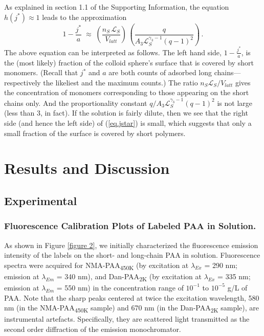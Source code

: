 \documentclass[twoside,twocolumn,9pt]{article}
\newcommand{\leng}{\mathcal{L}}
\begin{document}
As explained in section 1.1 of the Supporting Information, the equation
$h(j^*)\approx 1$ leads to the approximation
\begin{equation}
    \label{eq.jstar}
     1-\frac{j^*}{a}     \; \approx   \; 
        \left(  \frac{n_S\,\leng_S}{V_{latt} }\right) \,\left(   \frac{q}{A_3\leng_S^{\gamma_3-1}(q-1)^2}\right)  \,.
\end{equation}
The above equation can be interpreted as follows.  The left hand side, $1-\frac{j^*}{a}$, is the (most likely) fraction of the colloid sphere's surface that is covered by short monomers.  (Recall that $j^*$ and $a$ are both
counts of adsorbed long chains---respectively the likeliest and the maximum counts.)
The ratio $n_S\leng_S/V_{latt}$ gives
the concentration of monomers corresponding to those appearing on the short chains only.
And the proportionality constant $q/A_3\leng_S^{\gamma_3-1}(q-1)^2$ is not large (less than 3, in fact).
If the solution is fairly dilute, then we see that the right side (and hence the left side) of (\ref{eq.jstar}) is small, which suggests
that only a small fraction of the surface is covered by short polymers.



\section{Results and Discussion}   %
     \label{sec-results}

\subsection{Experimental}    %
    \label{sec-res-exp}

\subsubsection{Fluorescence Calibration Plots of Labeled PAA in Solution.}  %
    \label{sec-fluocalib}

As shown in Figure \ref{figure 2}, we initially characterized the fluorescence emission intensity of the labels on the short- and long-chain PAA in solution.  Fluorescence spectra
were acquired for NMA-PAA\textsubscript{450K} (by excitation at $\lambda_{Ex}$ = 290 nm; emission at $\lambda_{Em}$ = 340 nm),\cite{Anghel1998} and Dan-PAA\textsubscript{2K} (by excitation at $\lambda_{Ex}$ = 335 nm; emission at $\lambda_{Em}$ = 550 nm)\cite{Bednar1985} in the concentration range of $10^{-1}$ to $10^{-5}$ g/L of PAA.  Note that the sharp peaks centered at twice the excitation wavelength, 580 nm (in the NMA-PAA\textsubscript{450K} sample) and 670 nm (in the Dan-PAA\textsubscript{2K} sample), are instrumental artefacts.  Specifically, they are scattered light transmitted as the second order diffraction of the emission monochromator. 
\end{document}
